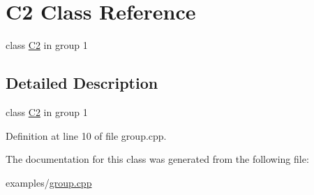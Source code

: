 \hypertarget{class_c2}{}\section{C2 Class Reference}
\label{class_c2}


class \mbox{\hyperlink{class_c2}{C2}} in group 1  




\subsection{Detailed Description}
class \mbox{\hyperlink{class_c2}{C2}} in group 1 

Definition at line 10 of file group.\+cpp.



The documentation for this class was generated from the following file\+:\begin{DoxyCompactItemize}
\item 
examples/\mbox{\hyperlink{group_8cpp}{group.\+cpp}}\end{DoxyCompactItemize}
